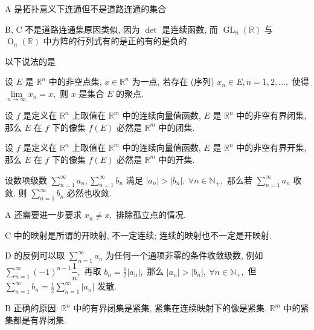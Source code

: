 \begin{solution}
A 是拓扑意义下连通但不是道路连通的集合

B, C 不是道路连通集原因类似, 因为 $\det$ 是连续函数, 而 $\operatorname{GL}_n(\mathbb{R})$ 与 $\operatorname{O}_n(\mathbb{R})$ 中方阵的行列式有的是正的有的是负的.
\end{solution}


\begin{question}
以下说法的是 \paren[B]

\begin{choices}
\item 设 $E$ 是 $\mathbb{R}^n$ 中的非空点集, $x \in \mathbb{R}^n$ 为一点, 若存在 (序列) $x_n \in E, n = 1, 2, \dots,$ 使得 $\lim\limits_{n\to\infty} x_n = x,$ 则 $x$ 是集合 $E$ 的聚点.
\item 设 $f$ 是定义在 $\mathbb{R}^n$ 上取值在 $\mathbb{R}^m$ 中的连续向量值函数, $E$ 是 $\mathbb{R}^n$ 中的非空有界闭集, 那么 $E$ 在 $f$ 下的像集 $f(E)$ 必然是 $\mathbb{R}^m$ 中的闭集.
\item 设 $f$ 是定义在 $\mathbb{R}^n$ 上取值在 $\mathbb{R}^m$ 中的连续向量值函数, $E$ 是 $\mathbb{R}^n$ 中的非空有界开集, 那么 $E$ 在 $f$ 下的像集 $f(E)$ 必然是 $\mathbb{R}^m$ 中的开集.
\item 设数项级数 $\displaystyle \sum_{n=1}^{\infty} a_n, \sum_{n=1}^{\infty} b_n$ 满足 $|a_n| > |b_n|, ~ \forall n \in \mathbb{N}_+,$ 那么若 $\displaystyle \sum_{n=1}^{\infty} a_n$ 收敛, 则 $\displaystyle \sum_{n=1}^{\infty} b_n$ 必然也收敛.
\end{choices}
\end{question}

\begin{solution}
A 还需要进一步要求 $x_n \neq x,$ 排除孤立点的情况.


C 中的映射是所谓的开映射, 不一定连续; 连续的映射也不一定是开映射.

D 的反例可以取 $\displaystyle \sum_{n=1}^{\infty} a_n$ 为任何一个通项非零的条件收敛级数, 例如 $\displaystyle \sum_{n=1}^{\infty} (-1)^{n-1} \dfrac{1}{n},$ 再取 $b_n = \frac{1}{2}|a_n|,$ 那么 $|a_n| > |b_n|, ~ \forall n \in \mathbb{N}_+,$ 但 $\displaystyle \sum_{n=1}^{\infty} b_n = \frac{1}{2} \sum_{n=1}^{\infty} |a_n|$ 发散.

B 正确的原因: $\mathbb{R}^n$ 中的有界闭集是紧集, 紧集在连续映射下的像是紧集. $\mathbb{R}^m$ 中的紧集都是有界闭集.
\end{solution}

